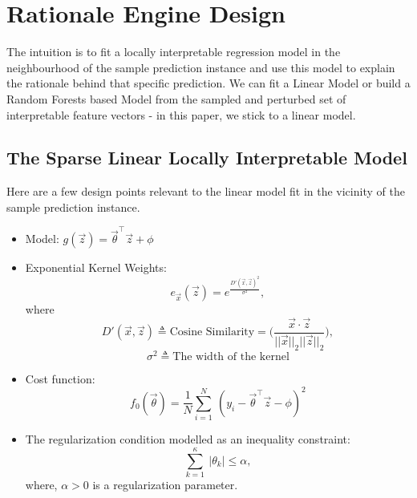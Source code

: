 \documentclass{article}
\begin{document}
\section{Rationale Engine Design}
The intuition is to fit a locally interpretable regression model in the neighbourhood of the sample prediction instance and use this model to explain the rationale behind that specific prediction. We can fit a Linear Model or build a Random Forests based Model from the sampled and perturbed set of interpretable feature vectors - in this paper, we stick to a linear model.
\subsection{The Sparse Linear Locally Interpretable Model}
Here are a few design points relevant to the linear model fit in the vicinity of the sample prediction instance.
\begin{itemize}
    \item Model: $g(\vec{z}) = \vec{\theta}^\intercal \vec{z} + \phi$
    \item Exponential Kernel Weights:
    \begin{equation}\label{1}
        e_{\vec{x}}(\vec{z}) = e^{\frac{D'(\vec{x}, \vec{z})^2}{\sigma^2}},
    \end{equation}
    where
    \begin{equation}\label{2}
        D'(\vec{x}, \vec{z}) \triangleq \text{Cosine Similarity} = \Big(\frac{\vec{x} \cdot \vec{z}}{||\vec{x}||_2 ||\vec{z}||_2}\Big),
    \end{equation}
    \[\sigma^2 \triangleq \text{The width of the kernel}\]
    \item Cost function:
    \begin{equation}\label{3}
        f_0(\vec{\theta}) = \frac{1}{N} \sum_{i=1}^N\ (y_i - \vec{\theta}^\intercal \vec{z} - \phi)^2
    \end{equation}
    \item The regularization condition modelled as an inequality constraint:
    \begin{equation}\label{4}
        \sum_{k=1}^{\kappa}\ |\theta_k| \leq \alpha,
    \end{equation}
    where, $\alpha > 0$ is a regularization parameter.
\end{itemize}
\end{document}
